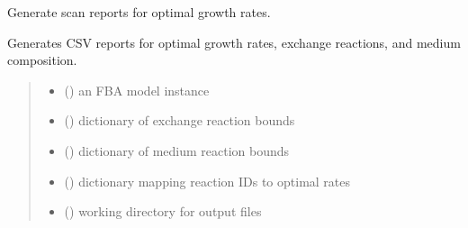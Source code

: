 \documentclass[letterpaper,12pt,english]{sphinxmanual}
\begin{document}
\begin{fulllineitems}
\label{\detokenize{api/core:cbmpy.CBTools.generateInputScanReports}}
\pysigstartsignatures
\pysiglinewithargsret
{}
{\sphinxparamcomma {}\sphinxparamcomma {}\sphinxparamcomma {}\sphinxparamcomma {}\sphinxparamcomma {}}
{}
\pysigstopsignatures
\sphinxAtStartPar
Generate scan reports for optimal growth rates.

\sphinxAtStartPar
Generates CSV reports for optimal growth rates, exchange reactions,
and medium composition.
\begin{quote}\begin{description}
\begin{itemize}
\item {} 
\sphinxAtStartPar
{} () \textendash{} an FBA model instance

\item {} 
\sphinxAtStartPar
{} () \textendash{} dictionary of exchange reaction bounds

\item {} 
\sphinxAtStartPar
{} () \textendash{} dictionary of medium reaction bounds

\item {} 
\sphinxAtStartPar
{} () \textendash{} dictionary mapping reaction IDs to optimal rates

\item {} 
\sphinxAtStartPar
{} () \textendash{} working directory for output files


\end{itemize}
\end{description}
\end{quote}
\end{fulllineitems}
\end{document}
